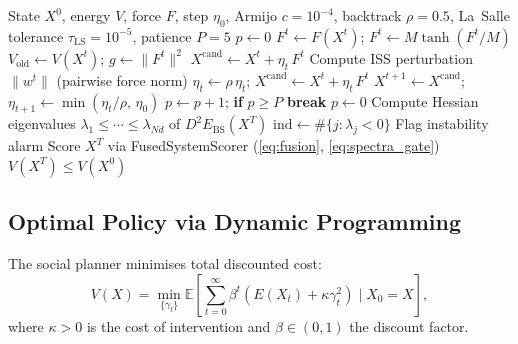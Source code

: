 \documentclass[final]{siamltex}
\newcommand{\E}{\mathbb{E}}
\newcommand{\norm}[1]{\lVert #1 \rVert}
\newcommand{\Ebs}{E_{\mathrm{BS}}}
\begin{document}
\begin{algorithm}[H]
\caption{Lyapunov v2 Barrier-Augmented Euler Integration
with Decoupled Morse Alarm}
\label{alg:adaptive}
\begin{algorithmic}[1]
\REQUIRE State $X^0$, energy $V$, force $F$, step $\eta_0$,
  Armijo $c = 10^{-4}$, backtrack $\rho = 0.5$,
  La~Salle tolerance $\tau_{\mathrm{LS}} = 10^{-5}$, patience $P = 5$
\STATE $p \leftarrow 0$ 
\STATE {}
  \STATE $F^t \leftarrow F(X^t)$;
    $F^t \leftarrow M\tanh(F^t / M)$ 
  \STATE $V_{\mathrm{old}} \leftarrow V(X^t)$;
    $g \leftarrow \norm{F^t}^2$
  \STATE $X^{\mathrm{cand}} \leftarrow X^t + \eta_t\,F^t$
  \STATE Compute ISS perturbation $\norm{w^t}$ (pairwise force norm)
  \WHILE{$V_{\mathrm{old}} - V(X^{\mathrm{cand}}) <
    c\,\eta_t\,g - \norm{w^t}^2$}
    \STATE $\eta_t \leftarrow \rho\,\eta_t$;
      $X^{\mathrm{cand}} \leftarrow X^t + \eta_t\,F^t$
  \ENDWHILE
  \STATE $X^{t+1} \leftarrow X^{\mathrm{cand}}$;
    $\eta_{t+1} \leftarrow \min(\eta_t / \rho,\, \eta_0)$
    \STATE $p \leftarrow p + 1$;
      \textbf{if} $p \ge P$ \textbf{break} 
  \ELSE
    \STATE $p \leftarrow 0$
  \ENDIF
\ENDFOR
\STATE {}
\STATE Compute Hessian eigenvalues $\lambda_1 \le \cdots \le
  \lambda_{Nd}$ of $D^2\Ebs(X^T)$
\STATE $\mathrm{ind} \leftarrow \#\{j : \lambda_j < 0\}$
  \STATE Flag instability alarm
\ENDIF
\STATE Score $X^T$ via FusedSystemScorer
  (\eqref{eq:fusion}, \eqref{eq:spectra_gate})
\ENSURE $V(X^T) \le V(X^0)$ 
\end{algorithmic}
\end{algorithm}

\subsection{Optimal Policy via Dynamic Programming}

The social planner minimises total discounted cost:
\begin{equation}\label{eq:dp}
  V(X) = \min_{\{\gamma_t\}}\E\!\left[\sum_{t=0}^\infty\beta^t
  (E(X_t)+\kappa\gamma_t^2)\;\Big|\;X_0=X\right],
\end{equation}
where $\kappa>0$ is the cost of intervention and $\beta\in(0,1)$
the discount factor.
\end{document}
